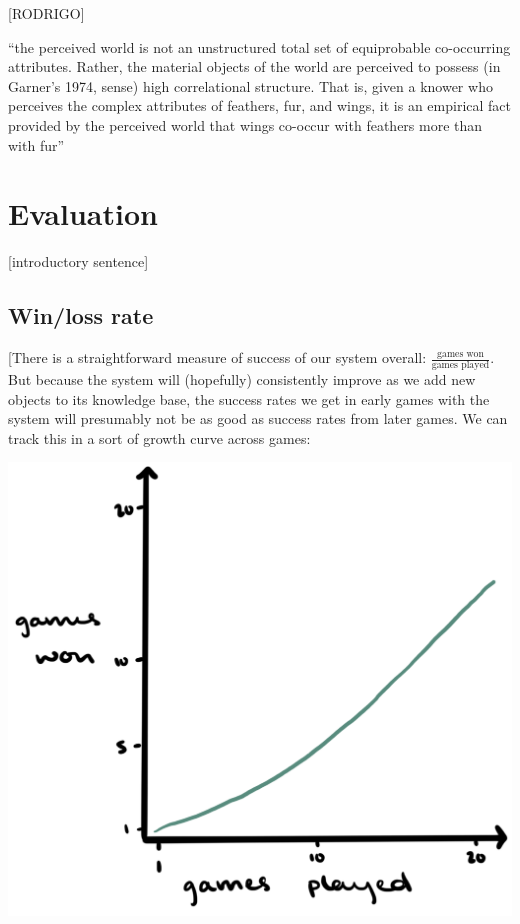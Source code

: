 \documentclass[11pt,a4paper]{article}
\begin{document}
[RODRIGO]

``the perceived world is not an unstructured total set of equiprobable co-occurring attributes. Rather, the material objects of the world are perceived to possess (in Garner's 1974, sense) high correlational structure.
That is, given a knower who perceives the complex attributes of feathers, fur, and wings, it is an empirical fact provided by the perceived world that wings co-occur with feathers more than with fur'' \citep[29]{Rosch1978}

\section{Evaluation}
\label{sec:eval}

[introductory sentence]

\subsection{Win/loss rate}

[There is a straightforward measure of success of our system overall: $\frac{\text{games won}}{\text{games played}}$.
But because the system will (hopefully) consistently improve as we add new objects to its knowledge base, the success rates we get in early games with the system will presumably not be as good as success rates from later games. 
We can track this in a sort of growth curve across games:

\begin{center}
	\includegraphics[width=.5\linewidth]{graphics/growth-curve.png}
\end{center}
\end{document}
